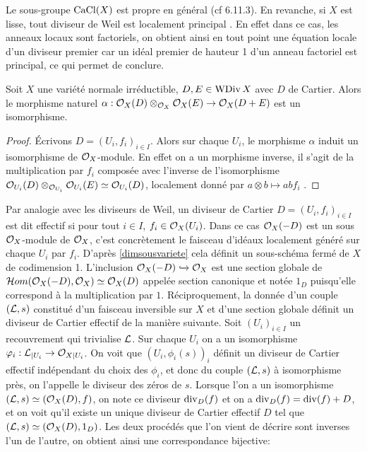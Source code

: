 Le sous-groupe $\operatorname{CaCl}(X)$ est propre en général (cf \cite{Hartshorne} 6.11.3). En revanche, si $X$ est lisse, tout diviseur de Weil est localement principal . En effet dans ce cas, les anneaux locaux sont factoriels, on obtient ainsi en tout point une équation locale d'un diviseur premier car un idéal premier de hauteur 1 d'un anneau factoriel est principal, ce qui permet de conclure.

\begin{prop}\label{isomophismeOTimes}
Soit $X$ une variété normale irréductible, $D,E\in\operatorname{WDiv} X$ avec $D$ de Cartier. Alors le morphisme naturel $\alpha:\mathcal{O}_X(D)\otimes_{\mathcal{O}_X}\mathcal{O}_X(E)\rightarrow \mathcal{O}_X(D+E)$ est un isomorphisme.
\end{prop}
\begin{proof}
Écrivons $D=(U_i,f_i)_{i\in I}$. Alors sur chaque $U_i$, le morphisme $\alpha$ induit un isomorphisme de $\mathcal{O}_X$-module. En effet on a un morphisme inverse, il s'agit de la multiplication par $f_i$ composée avec l'inverse de l'isomorphisme $\mathcal{O}_{U_i}(D)\otimes_{\mathcal{O}_{U_i}}\mathcal{O}_{U_i}(E) \simeq \mathcal{O}_{U_i}(D)$, localement donné par $a\otimes b\mapsto abf_i$ .
\end{proof}

Par analogie avec les diviseurs de Weil, un diviseur de Cartier $D=(U_i, f_i)_{i\in I}$ est dit effectif si pour tout $i\in I$, $f_i\in \mathcal{O}_X(U_i)$. Dans ce cas $\mathcal{O}_X(-D)$ est un sous $\mathcal{O}_X$-module de $\mathcal{O}_X$, c'est concrètement le faisceau d'idéaux localement généré sur chaque $U_i$ par $f_i$. D'après \ref{dimsousvariete} cela définit un sous-schéma fermé de $X$ de codimension 1. L'inclusion $\mathcal{O}_X(-D)\xhookrightarrow{} \mathcal{O}_X$ est une section globale de $\mathcal{H} om(\mathcal{O}_X(-D), \mathcal{O}_X)\simeq \mathcal{O}_X(D)$ appelée section canonique et notée $1_D$ puisqu'elle correspond à la multiplication par $1$. Réciproquement, la donnée d'un couple $(\mathcal{L}, s)$ constitué d'un faisceau inversible sur $X$ et d'une section globale définit un diviseur de Cartier effectif de la manière suivante. Soit $(U_i)_{i\in I}$ un recouvrement qui trivialise $\mathcal{L}$. Sur chaque $U_i$ on a un isomorphisme $\varphi_i:\mathcal{L}_{|U_i}\rightarrow\mathcal{O}_{X|U_i}$. On voit que $(U_i,\phi_i(s))_i$ définit un diviseur de Cartier effectif indépendant du choix des $\phi_i$, et donc du couple $(\mathcal{L},s)$ à isomorphisme près, on l'appelle le diviseur des zéros de $s$. Lorsque l'on a un isomorphisme $(\mathcal{L},s)\simeq (\mathcal{O}_X(D),f)$, on note ce diviseur $\operatorname{div}_D(f)$ et on a $\operatorname{div}_D(f)=\operatorname{div}(f)+D$, et on voit qu'il existe un unique diviseur de Cartier effectif $D$ tel que $(\mathcal{L},s)\simeq(\mathcal{O}_X(D),1_D)$. Les deux procédés que l'on vient de décrire sont inverses l'un de l'autre, on obtient ainsi une correspondance bijective:

